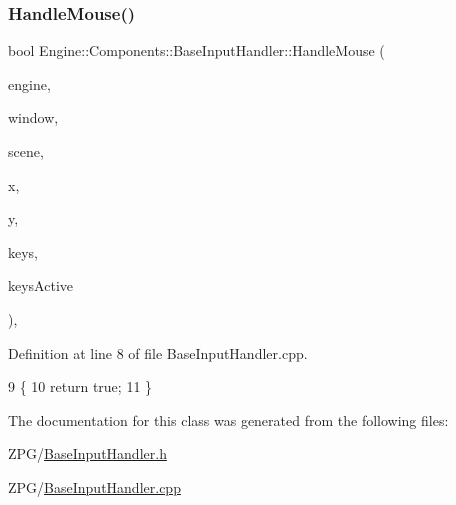 \subsubsection{\texorpdfstring{Handle\+Mouse()}{HandleMouse()}}
{\footnotesize\ttfamily bool Engine\+::\+Components\+::\+Base\+Input\+Handler\+::\+Handle\+Mouse (\begin{DoxyParamCaption}\item[{\mbox{\hyperlink{classEngine_1_1BaseEngine}{Base\+Engine}} $\ast$}]{engine,  }\item[{\mbox{\hyperlink{classEngine_1_1Components_1_1Window}{Window}} $\ast$}]{window,  }\item[{\mbox{\hyperlink{classEngine_1_1Components_1_1Scene}{Scene}} $\ast$}]{scene,  }\item[{double}]{x,  }\item[{double}]{y,  }\item[{\mbox{\hyperlink{classGeneric_1_1Dictionary}{Generic\+::\+Dictionary}}$<$ short, bool $>$ \&}]{keys,  }\item[{int}]{keys\+Active }\end{DoxyParamCaption})\hspace{0.3cm}{\ttfamily [override]}, {\ttfamily [virtual]}}



Definition at line 8 of file Base\+Input\+Handler.\+cpp.


\begin{DoxyCode}
9 \{
10     \textcolor{keywordflow}{return} \textcolor{keyword}{true};
11 \}
\end{DoxyCode}


The documentation for this class was generated from the following files\+:\begin{DoxyCompactItemize}
\item 
Z\+P\+G/\mbox{\hyperlink{BaseInputHandler_8h}{Base\+Input\+Handler.\+h}}\item 
Z\+P\+G/\mbox{\hyperlink{BaseInputHandler_8cpp}{Base\+Input\+Handler.\+cpp}}\end{DoxyCompactItemize}
